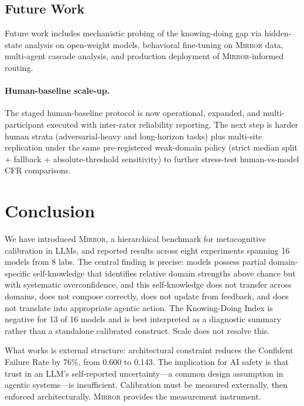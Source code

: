\documentclass[10pt]{article}
\newcommand{\mirror}{\textsc{Mirror}}
\begin{document}
\subsection{Future Work}

Future work includes mechanistic probing of the knowing-doing gap via hidden-state analysis on open-weight models, behavioral fine-tuning on \mirror{} data, multi-agent cascade analysis, and production deployment of \mirror{}-informed routing.

\paragraph{Human-baseline scale-up.}
The staged human-baseline protocol is now operational, expanded, and
multi-participant executed with inter-rater reliability reporting. The next
step is harder human strata (adversarial-heavy and long-horizon tasks) plus
multi-site replication under the same pre-registered weak-domain policy
(strict median split + fallback + absolute-threshold sensitivity) to further
stress-test human-vs-model CFR comparisons.

\vspace{-1mm}
\section{Conclusion}
\label{sec:conclusion}

We have introduced \mirror{}, a hierarchical benchmark for metacognitive
calibration in LLMs, and reported results across eight experiments spanning 16
models from 8 labs. The central finding is precise: models possess partial domain-specific
self-knowledge that identifies relative domain strengths above chance but with
systematic overconfidence, and this self-knowledge
does not transfer across domains, does not compose correctly, does not update from
feedback, and does not translate into appropriate agentic action. The Knowing-Doing
Index is negative for 13 of 16 models and is best interpreted as a diagnostic summary rather than a standalone calibrated construct. Scale does not resolve this.

What works is external structure: architectural constraint reduces the Confident
Failure Rate by 76\%, from 0.600 to 0.143. The implication for AI safety is that
trust in an LLM's self-reported uncertainty---a common design assumption in agentic
systems---is insufficient. Calibration must be measured externally, then enforced
architecturally. \mirror{} provides the measurement instrument.
\end{document}
